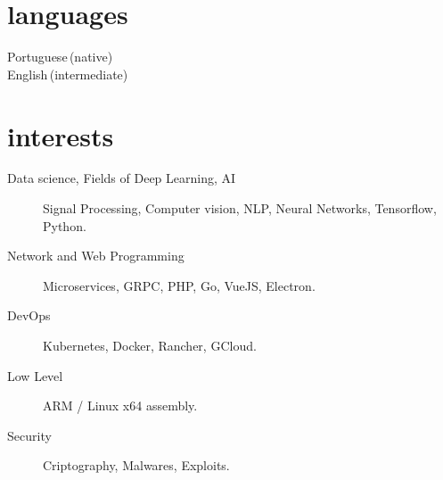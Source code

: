 \documentclass[]{cv-mauri}
\begin{document}
\section*{languages}
\begin{tabularcv}
    Portuguese\,(native) \\
    English\,(intermediate)
\end{tabularcv}

\section*{interests}
	\begin{description}
		\item [Data science, Fields of Deep Learning, AI] Signal Processing, Computer vision, NLP, Neural Networks, Tensorflow, Python.
		\item [Network and Web Programming] Microservices, GRPC, PHP, Go, VueJS, Electron.
		\item [DevOps] Kubernetes, Docker, Rancher, GCloud.
		\item [Low Level] ARM / Linux x64 assembly.
		\item [Security] Criptography, Malwares, Exploits.
	\end{description}
\end{document}
